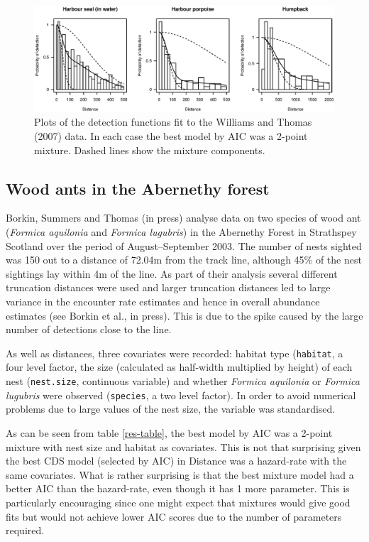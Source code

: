 \documentclass[useAMS,referee, usegraphicx]{biom}
\begin{document}
\begin{figure}
\centering
\includegraphics[width=\textwidth]{analyses/williamsplots.eps}
\caption{Plots of the detection functions fit to the Williams and Thomas (2007) data. In each case the best model by AIC was a 2-point mixture. Dashed lines show the mixture components.}
\label{williams-detfcts}
\end{figure}


\subsection{Wood ants in the Abernethy forest}

Borkin, Summers and Thomas (in press) analyse data on two species of wood ant (\textit{Formica aquilonia} and \textit{Formica lugubris}) in the Abernethy Forest in Strathspey Scotland over the period of August--September 2003. The number of nests sighted was 150 out to a distance of 72.04m from the track line, although 45\% of the nest sightings lay within 4m of the line. As part of their analysis several different truncation distances were used and larger truncation distances led to large variance in the encounter rate estimates and hence in overall abundance estimates (see Borkin et al., in press). This is due to the spike caused by the large number of detections close to the line.

As well as distances, three covariates were recorded: habitat type (\texttt{habitat}, a four level factor, the size (calculated as half-width multiplied by height) of each nest (\texttt{nest.size}, continuous variable) and whether \textit{Formica aquilonia} or \textit{Formica lugubris} were observed (\texttt{species}, a two level factor). In order to avoid numerical problems due to large values of the nest size, the variable was standardised.

As can be seen from table \ref{res-table}, the best model by AIC was a 2-point mixture with nest size and habitat as covariates. This is not that surprising given the best CDS model (selected by AIC) in Distance was a hazard-rate with the same covariates. What is rather surprising is that the best mixture model had a better AIC than the hazard-rate, even though it has 1 more parameter. This is particularly encouraging since one might expect that mixtures would give good fits but would not achieve lower AIC scores due to the number of parameters required.
\end{document}
